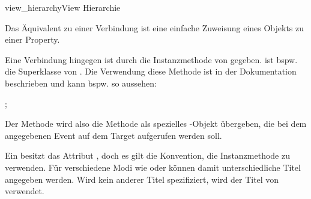 \documentclass[parskip=half, final]{scrreprt}
\begin{document}
\begin{lecture}
\begin{exc}
\begin{excitem}{view_hierarchy}{View Hierarchie}
\begin{exchinweise}
\item Das Äquivalent zu einer  Verbindung ist eine einfache Zuweisung eines  Objekts zu einer Property.
\item Eine  Verbindung hingegen ist durch die Instanzmethode  von  gegeben.  ist bspw. die Superklasse von . Die Verwendung diese Methode ist in der Dokumentation beschrieben und kann bspw. so aussehen:
\begin{objclst}
;
\end{objclst}
Der Methode wird also die Methode als spezielles -Objekt übergeben, die bei dem angegebenen Event auf dem Target aufgerufen werden soll.
\item Ein  besitzt das Attribut , doch es gilt die Konvention, die Instanzmethode  zu verwenden. Für verschiedene Modi wie  oder  können damit unterschiedliche Titel angegeben werden. Wird kein anderer Titel spezifiziert, wird der Titel von  verwendet.
\end{exchinweise}

\end{excitem}

\end{exc}


\end{lecture}
\end{document}
